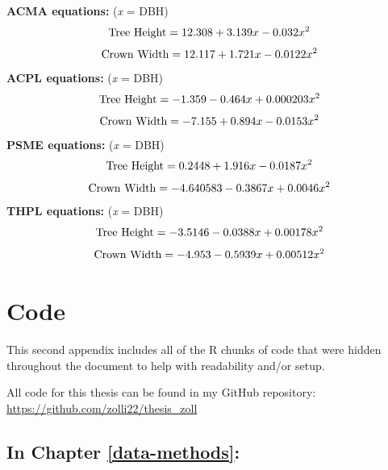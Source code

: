 \documentclass[12pt,twoside]{reedthesis}
\begin{document}
\textbf{ACMA equations:} (\textit{x} = DBH)
\begin{equation}
\textrm{Tree Height} = 12.308 + 3.139x -0.032x^{2}  \\
\label{eq:a1}
\end{equation}
\begin{equation}
\textrm{Crown Width} = 12.117 + 1.721x - 0.0122x^{2} \\
\label{eq:a2}
\end{equation}
\textbf{ACPL equations:} (\textit{x} = DBH)
\begin{equation}
\textrm{Tree Height} = -1.359 - 0.464x + 0.000203x^2 \\
\label{eq:a3}
\end{equation}
\begin{equation}
\textrm{Crown Width} = -7.155 + 0.894x - 0.0153x^2 \\
\label{eq:a4}
\end{equation}
\textbf{PSME equations:} (\textit{x} = DBH)
\begin{equation}
\textrm{Tree Height} = 0.2448 + 1.916x - 0.0187x^2 \\
\label{eq:a5}
\end{equation}
\begin{equation}
\textrm{Crown Width} = -4.640583 - 0.3867x + 0.0046x^2 \\
\label{eq:a6}
\end{equation}
\textbf{THPL equations:} (\textit{x} = DBH)
\begin{equation}
\textrm{Tree Height} = -3.5146 - 0.0388x + 0.00178x^2 \\
\label{eq:a7}
\end{equation}
\begin{equation}
\textrm{Crown Width} = -4.953 - 0.5939x + 0.00512x^2 \\
\label{eq:a8}
\end{equation}
\hypertarget{code-chunks}{%
\chapter{Code}\label{code-chunks}}

This second appendix includes all of the R chunks of code that were
hidden throughout the document to help with readability and/or setup.

All code for this thesis can be found in my GitHub repository:
\url{https://github.com/zolli22/thesis_zoll}

\hypertarget{in-chapter-refdata-methods}{%
\section*{\texorpdfstring{\textbf{In Chapter} \ref{data-methods}\textbf{:}}{In Chapter \ref{data-methods}:}}\label{in-chapter-refdata-methods}}
\end{document}
